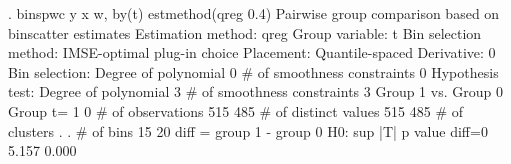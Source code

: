 . binspwc y x w, by(t) estmethod(qreg 0.4)
{\smallskip}
Pairwise group comparison based on binscatter estimates
Estimation method: qreg
Group variable: t
Bin selection method: IMSE-optimal plug-in choice
Placement: Quantile-spaced
Derivative: 0
Bin selection:                {\VBAR} 
         Degree of polynomial {\VBAR}       0
  \# of smoothness constraints {\VBAR}       0
Hypothesis test:              {\VBAR} 
         Degree of polynomial {\VBAR}       3
  \# of smoothness constraints {\VBAR}       3
{\smallskip}
Group 1 vs. Group 0
Group t=                      {\VBAR}      1   {\VBAR}     0
\# of observations             {\VBAR}     515  {\VBAR}     485
\# of distinct values          {\VBAR}     515  {\VBAR}     485
\# of clusters                 {\VBAR}       .  {\VBAR}       .
\# of bins                     {\VBAR}      15  {\VBAR}      20
{\smallskip}
diff = group 1 - group 0
H0:                {\VBAR} sup |T|           p value
diff=0             {\VBAR}   5.157             0.000
{\smallskip}
